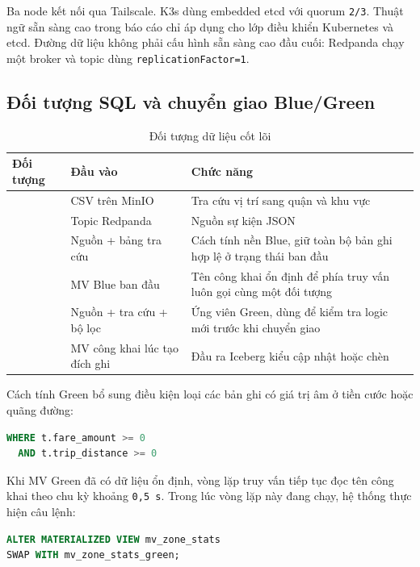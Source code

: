 Ba node kết nối qua Tailscale. K3s dùng embedded etcd với quorum \texttt{2/3}. Thuật ngữ sẵn sàng cao trong báo cáo chỉ áp dụng cho lớp điều khiển Kubernetes và etcd. Đường dữ liệu không phải cấu hình sẵn sàng cao đầu cuối: Redpanda chạy một broker và topic dùng \texttt{replicationFactor=1}.

\clearpage
\onecolumn
\subsection{Đối tượng SQL và chuyển giao Blue/Green}
\begin{table}[H]
\centering
\caption{Đối tượng dữ liệu cốt lõi}
\begin{tabularx}{\textwidth}{@{}p{}p{}Y@{}}
\toprule
\textbf{Đối tượng} & \textbf{Đầu vào} & \textbf{Chức năng}\\
\midrule
{} & CSV trên MinIO & Tra cứu vị trí sang quận và khu vực\\
 & Topic Redpanda & Nguồn sự kiện JSON\\
 & Nguồn + bảng tra cứu & Cách tính nền Blue, giữ toàn bộ bản ghi hợp lệ ở trạng thái ban đầu\\
 & MV Blue ban đầu & Tên công khai ổn định để phía truy vấn luôn gọi cùng một đối tượng\\
 & Nguồn + tra cứu + bộ lọc & Ứng viên Green, dùng để kiểm tra logic mới trước khi chuyển giao\\
 & MV công khai lúc tạo đích ghi & Đầu ra Iceberg kiểu cập nhật hoặc chèn\\
\bottomrule
\end{tabularx}
\end{table}

Cách tính Green bổ sung điều kiện loại các bản ghi có giá trị âm ở tiền cước hoặc quãng đường:

\begin{lstlisting}[language=SQL,caption={Điều kiện bổ sung trong cách tính Green}]
WHERE t.fare_amount >= 0
  AND t.trip_distance >= 0
\end{lstlisting}

Khi MV Green đã có dữ liệu ổn định, vòng lặp truy vấn tiếp tục đọc tên công khai theo chu kỳ khoảng \texttt{0,5 s}. Trong lúc vòng lặp này đang chạy, hệ thống thực hiện câu lệnh:

\begin{lstlisting}[language=SQL,caption={Câu lệnh hoán đổi tên MV}]
ALTER MATERIALIZED VIEW mv_zone_stats
SWAP WITH mv_zone_stats_green;
\end{lstlisting}

